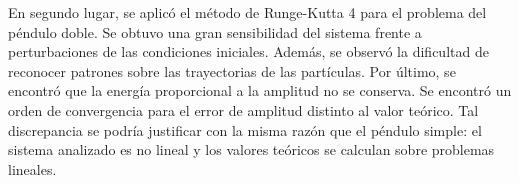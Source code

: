 \documentclass[aps,prb,twocolumn,superscriptaddress,floatfix,longbibliography]{revtex4-2}
\newcounter{para}
\begin{document}
En segundo lugar, se aplicó el método de Runge-Kutta 4 para el problema del péndulo doble. Se obtuvo una gran sensibilidad del sistema frente a perturbaciones de las condiciones iniciales. Además, se observó la dificultad de reconocer patrones sobre las trayectorias de las partículas. Por último, se encontró que la energía proporcional a la amplitud no se conserva. Se encontró un orden de convergencia para el error de amplitud distinto al valor teórico. Tal discrepancia se podría justificar con la misma razón que el péndulo simple: el sistema analizado es no lineal y los valores teóricos se calculan sobre problemas lineales.



\end{document}
